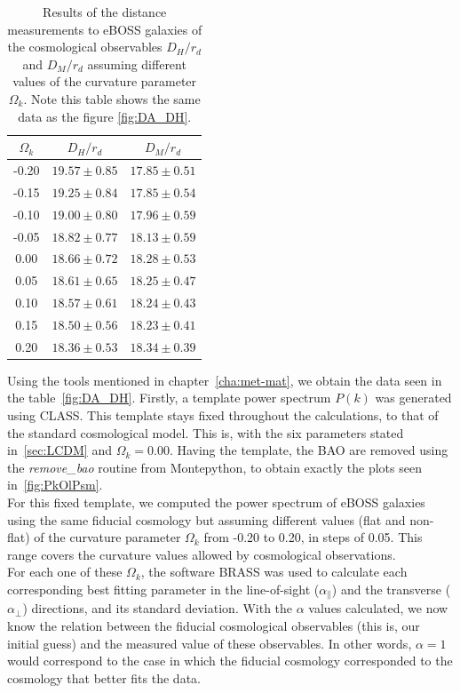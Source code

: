 \begin{table}
	\begin{center}
\begin{tabular}{|c|c|c|}
	\hline
$\Omega_k$ & $D_H/r_d$ & $D_M/r_d$ \\
\hline
-0.20 & $19.57 \pm 0.85$ & $17.85 \pm 0.51$ \\
-0.15 & $19.25 \pm 0.84$ & $17.85 \pm 0.54$ \\
-0.10& $19.00 \pm 0.80$ & $17.96 \pm 0.59$ \\
-0.05 & $18.82 \pm 0.77$ & $18.13 \pm 0.59$ \\
0.00 & $18.66 \pm 0.72$ & $18.28 \pm 0.53$ \\
0.05 & $18.61 \pm 0.65$ & $18.25 \pm 0.47$ \\
0.10 & $18.57 \pm 0.61$ & $18.24 \pm 0.43$ \\
0.15 & $18.50\pm 0.56$ & $18.23 \pm 0.41$ \\
0.20 & $18.36 \pm 0.53$ & $18.34 \pm 0.39$ \\
\hline
\end{tabular}
\end{center}
\caption[Distance measurements to eBOSS galaxies for different assumed values of the curvature parameter $\Omega_k$.]{Results of the distance measurements to eBOSS galaxies of the cosmological observables $D_H /r_d$ and $D_M /r_d$ assuming different values of the curvature parameter $\Omega_k$. Note this table shows the same data as the figure \ref{fig:DA_DH}.}	
\label{tab:DA_DH}
\end{table}
Using the tools mentioned in chapter~\ref{cha:met-mat}, we obtain the data seen in the table~\ref{fig:DA_DH}. Firstly, a template power spectrum $P(k)$ was generated using CLASS. This template stays fixed throughout the calculations, to that of the standard cosmological model. This is, with the six parameters stated in~\ref{sec:LCDM} and $\Omega_k=0.00$. Having the template, the BAO are removed using the \textit{remove\_bao} routine from Montepython, to obtain exactly the plots seen in~\ref{fig:PkOlPsm}. \\

For this fixed template, we computed the power spectrum of eBOSS galaxies using the same fiducial cosmology but assuming different values (flat and non-flat) of the curvature parameter $\Omega_k$ from -0.20 to 0.20, in steps of 0.05. This range covers the curvature values allowed by cosmological observations. \\

For each one of these $\Omega_k$, the software BRASS was used to calculate each corresponding best fitting parameter in the line-of-sight ($\alpha_\parallel$) and the transverse ($\alpha_\perp$) directions, and its standard deviation. With the $\alpha$ values calculated, we now know the relation between the fiducial cosmological observables (this is, our initial guess) and the measured value of these observables. In other words, $\alpha=1$ would correspond to the case in which the fiducial cosmology corresponded to the cosmology that better fits the data.\\

